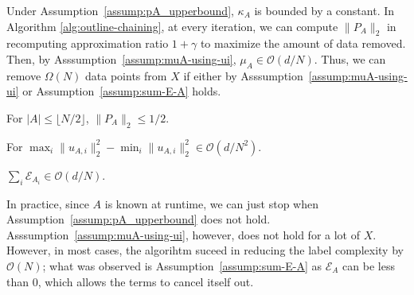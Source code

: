 Under Assumption~\ref{assump:pA_upperbound}, $\kappa_A$ is bounded by a constant. In Algorithm \ref{alg:outline-chaining}, at every iteration, we can compute $\lVert P_A \rVert_2$ in recomputing approximation ratio $1 + \gamma$ to maximize the amount of data removed. Then, by Asssumption~\ref{assump:muA-using-ui}, $\mu_A \in \mathcal{O}(d/N)$. Thus, we can remove $\Omega(N)$ data points from $X$ if either by Asssumption~\ref{assump:muA-using-ui} or Assumption~\ref{assump:sum-E-A} holds.

\begin{assump} \label{assump:pA_upperbound}
  For $|A| \leq \lfloor N/2 \rfloor$, $\lVert P_A \rVert_2 \leq 1/2$.
\end{assump}

\begin{assump} \label{assump:muA-using-ui}
  For $\max_i \lVert u_{A, i} \rVert^2_2 - \min_i \lVert u_{A, i} \rVert^2_2 \in \mathcal{O}(d / N^2)$.
\end{assump}

\begin{assump} \label{assump:sum-E-A}
    $\sum_i \mathcal{E}_{A_i} \in \mathcal{O}(d / N)$.
\end{assump}

In practice, since $A$ is known at runtime, we can just stop when Assumption~\ref{assump:pA_upperbound} does not hold.  Asssumption~\ref{assump:muA-using-ui}, however, does not hold for a lot of $X$. However, in most cases, the algorihtm suceed in reducing the label complexity by $\mathcal{O}(N)$; what was observed is Assumption~\ref{assump:sum-E-A} as $\mathcal{E}_A$ can be less than 0, which allows the terms to cancel itself out.





